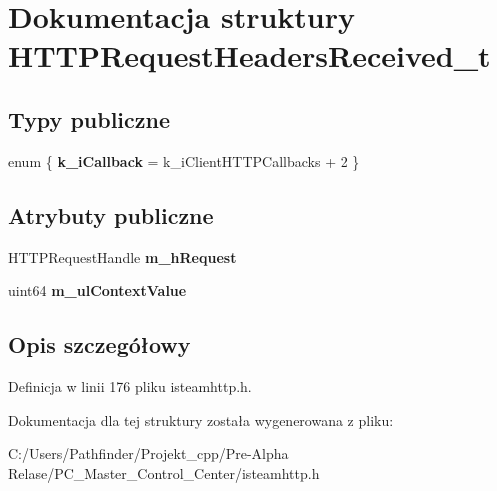 \hypertarget{struct_h_t_t_p_request_headers_received__t}{}\section{Dokumentacja struktury H\+T\+T\+P\+Request\+Headers\+Received\+\_\+t}
\label{struct_h_t_t_p_request_headers_received__t}
\subsection*{Typy publiczne}
\begin{DoxyCompactItemize}
\item 
\mbox{\label{struct_h_t_t_p_request_headers_received__t_a64ae4f73081e95aae92a89bc42cc4a58}} 
enum \{ {\bfseries k\+\_\+i\+Callback} = k\+\_\+i\+Client\+H\+T\+T\+P\+Callbacks + 2
 \}
\end{DoxyCompactItemize}
\subsection*{Atrybuty publiczne}
\begin{DoxyCompactItemize}
\item 
\mbox{\label{struct_h_t_t_p_request_headers_received__t_a93f8fb83cc7d4ba43d23e205c463b1ae}} 
H\+T\+T\+P\+Request\+Handle {\bfseries m\+\_\+h\+Request}
\item 
\mbox{\label{struct_h_t_t_p_request_headers_received__t_a29092d5ae7e32a5117be434f363ba9a3}} 
uint64 {\bfseries m\+\_\+ul\+Context\+Value}
\end{DoxyCompactItemize}


\subsection{Opis szczegółowy}


Definicja w linii 176 pliku isteamhttp.\+h.



Dokumentacja dla tej struktury została wygenerowana z pliku\+:\begin{DoxyCompactItemize}
\item 
C\+:/\+Users/\+Pathfinder/\+Projekt\+\_\+cpp/\+Pre-\/\+Alpha Relase/\+P\+C\+\_\+\+Master\+\_\+\+Control\+\_\+\+Center/isteamhttp.\+h\end{DoxyCompactItemize}
